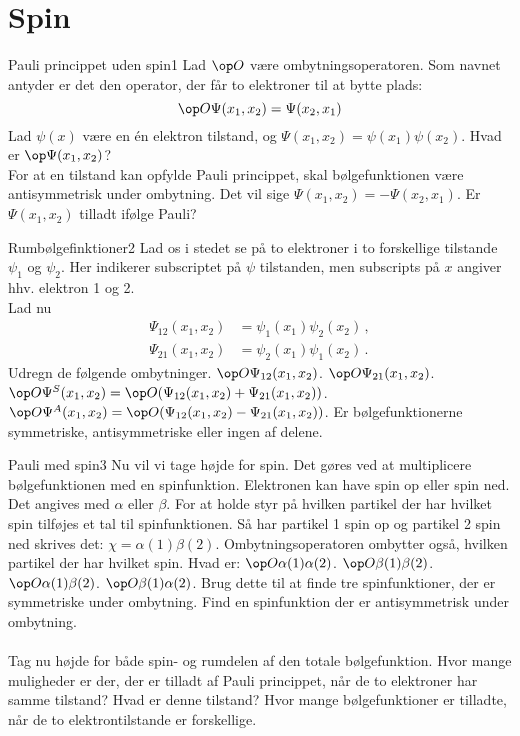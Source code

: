 \section*{Spin}
\begin{opgave}{Pauli princippet uden spin}{1}
Lad $\op O$ være ombytningsoperatoren. Som navnet antyder er det den operator, der får to elektroner til at bytte plads:
$$
\op O \Psi(x_1,x_2) = \Psi(x_2,x_1)
$$
Lad $\psi(x)$ være en én elektron tilstand, og $\Psi(x_1,x_2) = \psi(x_1)\psi(x_2)$.
\opg Hvad er $\op \Psi(x_1,x_2)$?\\
For at en tilstand kan opfylde Pauli princippet, skal bølgefunktionen være antisymmetrisk under ombytning. Det vil sige $\Psi(x_1,x_2) = -\Psi(x_2,x_1)$.
\opg Er $\Psi(x_1,x_2)$ tilladt ifølge Pauli?
\end{opgave}
%
\begin{opgave}{Rumbølgefinktioner}{2}
Lad os i stedet se på to elektroner i to forskellige tilstande $\psi_1$ og $\psi_2$. Her indikerer subscriptet på $\psi$ tilstanden, men subscripts på $x$ angiver hhv. elektron 1 og 2.\\
Lad nu
\begin{align*}
\Psi_{12}(x_1,x_2) &= \psi_1(x_1)\psi_2(x_2) \, , \\
\Psi_{21}(x_1,x_2) &= \psi_2(x_1)\psi_1(x_2) \, .
\end{align*}
Udregn de følgende ombytninger.
\opg $\op O \Psi_{12}(x_1,x_2)$.
\opg $\op O \Psi_{21}(x_1,x_2)$.
\opg $\op O \Psi^S(x_1,x_2)=\op O (\Psi_{12}(x_1,x_2)+\Psi_{21}(x_1,x_2))$.
\opg $\op O \Psi^A(x_1,x_2)=\op O (\Psi_{12}(x_1,x_2)-\Psi_{21}(x_1,x_2))$.
\opg Er bølgefunktionerne symmetriske, antisymmetriske eller ingen af delene.
\end{opgave}
%
\begin{opgave}{Pauli med spin}{3}
Nu vil vi tage højde for spin. Det gøres ved at multiplicere bølgefunktionen med en spinfunktion. Elektronen kan have spin op eller spin ned. Det angives med $\alpha$ eller $\beta$. For at holde styr på hvilken partikel der har hvilket spin tilføjes et tal til spinfunktionen. Så har partikel 1 spin op og partikel 2 spin ned skrives det: $\chi=\alpha(1)\beta(2)$.
Ombytningsoperatoren ombytter også, hvilken partikel der har hvilket spin.
Hvad er:
\opg $\op O \alpha(1)\alpha(2)$.
\opg $\op O \beta(1)\beta(2)$.
\opg $\op O \alpha(1)\beta(2)$.
\opg $\op O \beta(1)\alpha(2)$.
\opg Brug dette til at finde tre spinfunktioner, der er symmetriske under ombytning.
\opg Find en spinfunktion der er antisymmetrisk under ombytning.\\ \\
Tag nu højde for både spin- og rumdelen af den totale bølgefunktion.
\opg Hvor mange muligheder er der, der er tilladt af Pauli princippet, når de to elektroner har samme tilstand?
\opg Hvad er denne tilstand?
\opg Hvor mange bølgefunktioner er tilladte, når de to elektrontilstande er forskellige.
\end{opgave}